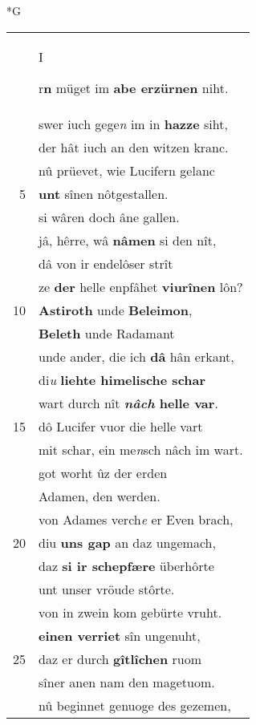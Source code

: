 \documentclass[8pt,a4paper,notitlepage]{article}
\begin{document}
\newpage
\begin{table}[ht]
\begin{minipage}[t]{0.5\linewidth}
\small
\begin{center}*G
\end{center}
\begin{tabular}{rl}
 & \begin{large}I\end{large}r\textbf{n} müget im \textbf{abe erzürnen} niht.\\ 
 & swer iuch gege\textit{n} im in \textbf{hazze} siht,\\ 
 & der hât iuch an den witzen kranc.\\ 
 & nû prüevet, wie Lucifern gelanc\\ 
5 & \textbf{unt} sînen nôtgestallen.\\ 
 & si wâren doch âne gallen.\\ 
 & jâ, hêrre, wâ \textbf{nâmen} si den nît,\\ 
 & dâ von ir endelôser strît\\ 
 & ze \textbf{der} helle enpfâhet \textbf{viurînen} lôn?\\ 
10 & \textbf{Astiroth} unde \textbf{Beleimon},\\ 
 & \textbf{Beleth} unde Radamant\\ 
 & unde ander, die ich \textbf{dâ} hân erkant,\\ 
 & di\textit{u} \textbf{liehte himelische schar}\\ 
 & wart durch nît \textbf{\textit{nâch} helle var}.\\ 
15 & dô Lucifer vuor die helle vart\\ 
 & mit schar, ein me\textit{n}sch nâch im wart.\\ 
 & got worht ûz der erden\\ 
 & Adamen, den werden.\\ 
 & von Adames verch\textit{e} er Even brach,\\ 
20 & diu \textbf{uns gap} an daz ungemach,\\ 
 & daz \textbf{si ir schepfære} überhôrte\\ 
 & unt unser vröude stôrte.\\ 
 & von in zwein kom gebürte vruht.\\ 
 & \textbf{einen verriet} sîn ungenuht,\\ 
25 & daz er durch \textbf{gîtlîchen} ruom\\ 
 & sîner anen nam den magetuom.\\ 
 & nû beginnet genuoge des gezemen,\\ 

\end{tabular}
\end{minipage}
\end{table}
\end{document}
